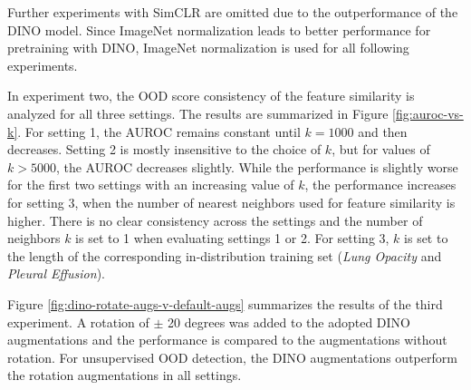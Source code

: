 Further experiments with SimCLR are omitted due to the outperformance of the DINO model.
Since ImageNet normalization leads to better performance for pretraining with DINO, ImageNet normalization is used for all following experiments.
\par
In experiment two, the OOD score consistency of the feature similarity is analyzed for all three settings.
The results are summarized in Figure \ref{fig:auroc-vs-k}.
For setting 1, the AUROC remains constant until $k=1000$ and then decreases.
Setting 2 is mostly insensitive to the choice of $k$, but for values of $k>5000$, the AUROC decreases slightly.
While the performance is slightly worse for the first two settings with an increasing value of $k$, the performance increases for setting 3, when the number of nearest neighbors used for feature similarity is higher.
There is no clear consistency across the settings and the number of neighbors $k$ is set to 1 when evaluating settings 1 or 2.
For setting 3, $k$ is set to the length of the corresponding in-distribution training set (\textit{Lung Opacity} and \textit{Pleural Effusion}).
\par
Figure \ref{fig:dino-rotate-augs-v-default-augs} summarizes the results of the third experiment.
A rotation of $\pm$ 20 degrees was added to the adopted DINO augmentations and the performance is compared to the augmentations without rotation.
For unsupervised OOD detection, the DINO augmentations outperform the rotation augmentations in all settings.
